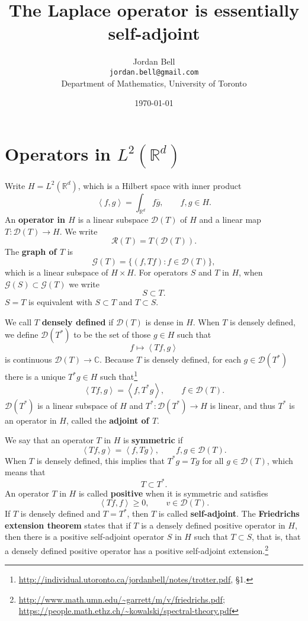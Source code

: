 \documentclass{article}
\newcommand{\inner}[2]{\left\langle #1, #2 \right\rangle}
\theoremstyle{definition}
\begin{document}
\title{The Laplace operator is essentially self-adjoint}
\author{Jordan Bell\\ \texttt{jordan.bell@gmail.com}\\Department of Mathematics, University of Toronto}
\date{\today}

\maketitle


\section{Operators in $L^2(\mathbb{R}^d)$}
\label{section1}
Write
$H=L^2(\mathbb{R}^d)$, which is a Hilbert space with inner product
\[
\inner{f}{g} = \int_{\mathbb{R}^d} f \overline{g}, \qquad f,g \in H.
\]
An \textbf{operator in $H$} is a linear subspace $\mathscr{D}(T)$ of $H$ and  a linear map $T:\mathscr{D}(T) \to H$. 
We write
\[
\mathscr{R}(T) = T(\mathscr{D}(T)).
\]
The \textbf{graph of $T$} is
\[
\mathscr{G}(T)=\{(f,Tf): f \in \mathscr{D}(T)\},
\]
 which is a linear subspace of $H \times H$. 
For operators $S$ and $T$ in $H$, when $\mathscr{G}(S) \subset \mathscr{G}(T)$ we write
\[
S \subset T.
\]
$S=T$ is equivalent with $S \subset T$ and $T \subset S$. 

 We call $T$ \textbf{densely defined} if $\mathscr{D}(T)$ is dense in $H$. 
When $T$ is densely defined, we define $\mathscr{D}(T^*)$ to be the set of those $g \in H$ such that
\[
f \mapsto \inner{Tf}{g}
\]
is continuous $\mathscr{D}(T) \to \mathbb{C}$. 
Because $T$ is densely defined, for each $g \in \mathscr{D}(T^*)$ there is a unique $T^*g \in H$ such that\footnote{\url{http://individual.utoronto.ca/jordanbell/notes/trotter.pdf},
\S 1.}
\[
\inner{Tf}{g} = \inner{f}{T^*g}, \qquad f \in \mathscr{D}(T).
\]
$\mathscr{D}(T^*)$ is a linear subspace of $H$ and $T^*:\mathscr{D}(T^*) \to H$ is linear, and thus $T^*$ is an operator
in $H$, called the \textbf{adjoint of $T$}.



We say that an operator $T$ in $H$ is \textbf{symmetric} if
\[
\inner{Tf}{g} = \inner{f}{Tg}, \qquad f,g \in \mathscr{D}(T).
\]
When $T$ is densely defined,
this implies that $T^*g=Tg$ for all $g \in \mathscr{D}(T)$,
which means that
\[
T \subset T^*.
\]
An operator $T$ in $H$ is called
 \textbf{positive} when it is symmetric and satisfies
\[
\inner{Tf}{f} \geq 0,\qquad v \in \mathscr{D}(T).
\]
If $T$ is densely defined and $T=T^*$, then $T$ is called \textbf{self-adjoint}.
The \textbf{Friedrichs extension theorem} states that if  $T$ is a densely defined positive 
operator in $H$, then there is a positive self-adjoint  operator $S$ in $H$ such that
$T \subset S$, that is, that a densely defined positive operator has a positive 
self-adjoint extension.\footnote{\url{http://www.math.umn.edu/~garrett/m/v/friedrichs.pdf}; \url{https://people.math.ethz.ch/~kowalski/spectral-theory.pdf}}
\end{document}
